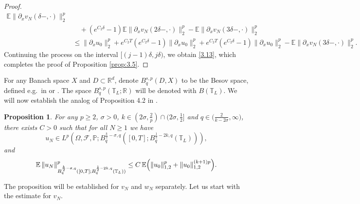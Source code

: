 \documentclass[a4paper,12pt]{article}
\newtheorem{proposition}[definition]{Proposition}
\numberwithin{equation}{section}
\newcommand{\R}{{\mathbb R}}
\def\T{\mathbb{T}_L}
\def\R{\mathbb{R}}
\begin{document}
\begin{proof}
\begin{align*}
\mathbb{E}\|\partial_x v_N(\delta-,\cdot)\|_{2}^{p} \\
&\quad + \left(e^{C_2\delta}-1\right)\mathbb{E}\|\partial_x v_N(2\delta-,\cdot)\|_{2}^{p} - \mathbb{E}\|\partial_x v_N(3\delta-,\cdot)\|_{2}^{p} \\
& \le \|\partial_x u_0\|_{2}^{p} + e^{C_2 T} \left(e^{C_2\delta}-1\right) \|\partial_x u_0\|_{2}^{p} + e^{C_2 T} \left(e^{C_2\delta}-1\right) \|\partial_x u_0\|_{2}^{p} - \mathbb{E}\|\partial_x v_N(3\delta-,\cdot)\|_{2}^{p}.
\end{align*}
Continuing the process on the interval $[(j-1)\delta,j\delta)$,
we obtain \eqref{3.13}, which completes the proof of Proposition \ref{prop:3.5}. 
\end{proof}






For any Banach space $X$ and $D \subset \mathbb{R}^d$, denote $B^{s,p}_q(D,X)$
to be the Besov space, defined e.g.\ in \cite{BerLof} or \cite{Tri}.
The space $B^{s,p}_q(\T;\R)$ will be denoted with $B(\T)$.
We will now establish the analog of Proposition 4.2 in \cite{Gess1}.

\medskip

\noindent
\begin{proposition}
    

For any $p \geq 2$, $\sigma>0$, $k \in (2 \sigma, \tfrac{2}{p}) \cap (2 \sigma,\tfrac12]$
and $q \in \bigl(\tfrac{2}{k-2\sigma}, \infty\bigr)$,
there exists $C>0$ such that for all $N \ge 1$ we have
\begin{equation*}\label{3.18}
u_N \in L^p(\Omega,\mathcal{F},\mathbb{P};
B^{\frac{k}{2}-\sigma,q}_q([0,T]; B^{\frac12-2k,q}_q(\T))
),
\end{equation*}
and
\begin{equation}\label{3.19}
\mathbb{E}\,
\|u_N\|^p_{B^{\frac{k}{2}-\sigma,q}_q([0,T];
B^{\frac12-2k,q}_q(\T))}
\le
C\,\mathbb{E}\Bigl(
\|u_0\|_{1,2}^p + \|u_0\|_{1,2}^{(k+1)p}
\Bigr).
\end{equation}
\end{proposition}

The proposition will be established for $v_N$ and $w_N$
separately. Let us start with the estimate for $v_N$.

\medskip
\end{document}
